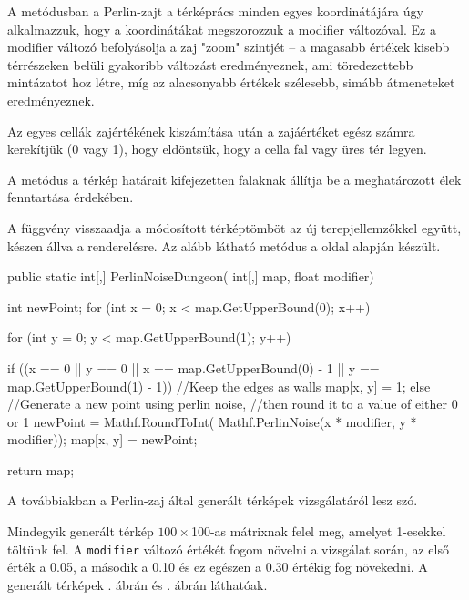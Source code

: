 A metódusban a Perlin-zajt a térképrács minden egyes koordinátájára úgy alkalmazzuk, hogy a koordinátákat megszorozzuk a modifier változóval. Ez a modifier változó befolyásolja a zaj "zoom" szintjét -- a magasabb értékek kisebb térrészeken belüli gyakoribb változást eredményeznek, ami töredezettebb mintázatot hoz létre, míg az alacsonyabb értékek szélesebb, simább átmeneteket eredményeznek.

Az egyes cellák zajértékének kiszámítása után a zajáértéket egész számra kerekítjük (0 vagy 1), hogy eldöntsük, hogy a cella fal vagy üres tér legyen.

A metódus a térkép határait kifejezetten falaknak állítja be a meghatározott élek fenntartása érdekében.

A függvény visszaadja a módosított térképtömböt az új terepjellemzőkkel együtt, készen állva a renderelésre. Az alább látható metódus a \cite{mapgenerator} oldal alapján készült.

\begin{java}
public static int[,] PerlinNoiseDungeon(
    int[,] map, float modifier)
{
    int newPoint;
    for (int x = 0; x < 
        map.GetUpperBound(0); x++)
    {
        for (int y = 0; y < 
            map.GetUpperBound(1); y++)
        {

            if ((x == 0 || y == 0 || 
                x == map.GetUpperBound(0) - 1 || 
                y == map.GetUpperBound(1) - 1))
            {
                //Keep the edges as walls
                map[x, y] = 1;
            }
            else
            {
                //Generate a new point using perlin noise,
                //then round it to a value of either 0 or 1
                newPoint = Mathf.RoundToInt(
                    Mathf.PerlinNoise(x * modifier, 
                    y * modifier));
                map[x, y] = newPoint;
            }
        }
    }
    return map;
}
\end{java}

A továbbiakban a Perlin-zaj által generált térképek vizsgálatáról lesz szó.

Mindegyik generált térkép $100 \times $100-as mátrixnak felel meg, amelyet 1-esekkel töltünk fel. A \texttt{modifier} változó értékét fogom növelni a vizsgálat során, az első érték a 0.05, a második a 0.10 és ez egészen a 0.30 értékig fog növekedni. A generált térképek . ábrán és . ábrán láthatóak.

